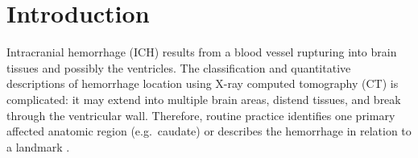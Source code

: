 %
%
%
%
%
%
%
%
%

\section{Introduction}

Intracranial hemorrhage (ICH) results from a blood vessel rupturing into brain tissues and possibly the ventricles. The classification and quantitative descriptions of hemorrhage location using X-ray computed tomography (CT) is complicated: it may extend into multiple brain areas, distend tissues, and break through the ventricular wall. Therefore, routine practice identifies one primary affected anatomic region (e.g.~caudate) \citep{mendelow_early_2013, anderson_intensive_2008, antihypertensive_treatment_of_acute_cerebral_hemorrhage_atach_investigators_antihypertensive_2010} or describes the hemorrhage in relation to a landmark \citep{ziai_multicenter_2014}.

